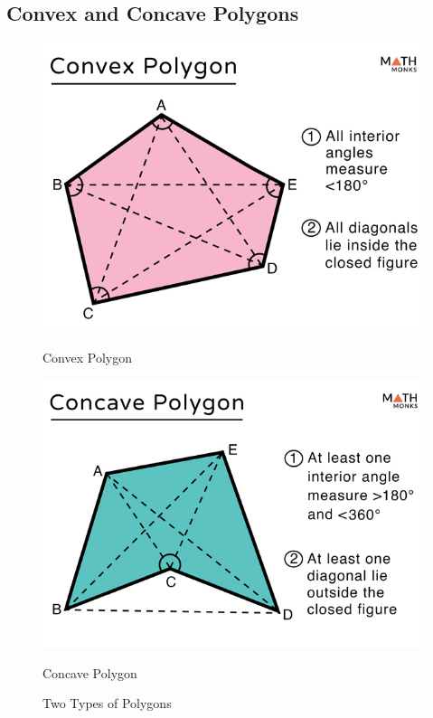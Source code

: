 \subsection{Convex and Concave Polygons}


\begin{figure}[H]
    \centering
    \begin{minipage}[b]{0.25\textwidth}
        \centering
        \includegraphics[width=\linewidth]{media/Convex-Polygon.jpg}
        \caption{Convex Polygon}
    \end{minipage}%
    \begin{minipage}[b]{0.25\textwidth}
        \centering
        \includegraphics[width=\linewidth]{media/Concave-Polygon.jpg}
        \caption{Concave Polygon}
    \end{minipage}
    \caption{Two Types of Polygons}
\end{figure}


